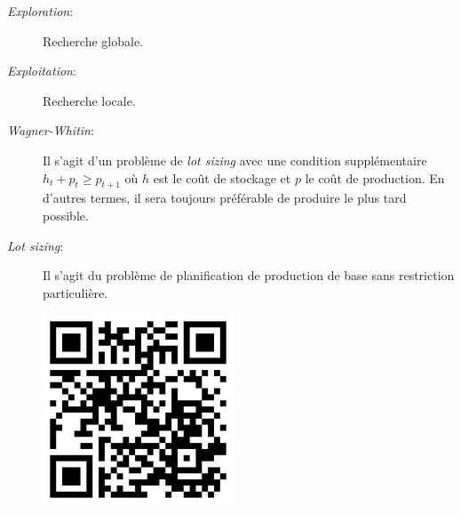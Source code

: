 \documentclass[12pt,a4paper]{article}
\begin{document}
\begin{description}
		\item[\emph{Exploration}:] Recherche globale.
		\vspace*{.3cm}
		\item[\emph{Exploitation}:] Recherche locale.
		\vspace*{.3cm}
		\item[\emph{Wagner-Whitin}:] Il s'agit d'un problème de \emph{lot sizing} avec une condition supplémentaire $h_{t} + p_{t} \geq p_{t+1}$ où $h$ est le coût de stockage et $p$ le coût de production. En d'autres termes, il sera toujours préférable de produire le plus tard possible.
		\vspace*{.3cm}
		\item[\emph{Lot sizing}:] Il s'agit du problème de planification de production de base sans restriction particulière.
		
	\end{description}

	\newpage
	
	\begin{center}
		\begin{figure}[!h]
			\includegraphics[scale=.2]{img/thesis_project_qrcode.png}
		\end{figure}
	\end{center}
	
\end{document}

